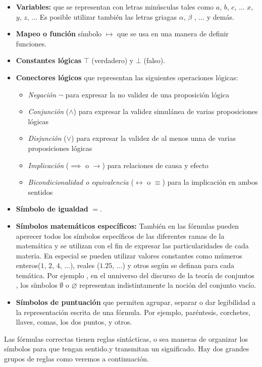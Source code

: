 \begin{itemize}
\item{\textbf{Variables:} que se representan con letras minúsculas tales como $a$, $b$, $c$, ... $x$, $y$, $z$, ... Es posible  utilizar también las letras griagas $\alpha$, $\beta$ , ... y demás.}
\item{\textbf{Mapeo o función} símbolo $\mapsto$ que se usa en una manera de definir funciones.}
\item{\textbf{Constantes lógicas} $\top$ (verdadero) y $\bot$ (falso).}
\item{\textbf{Conectores lógicos} que representan las siguientes operaciones lógicas:}
	\begin{itemize}
		\item{\textit{Negación} $\neg$ para expresar la no validez de una proposición lógica}
		\item{\textit{Conjunción} ($\land$) para expresar la validez simulánea de varias proposiciones lógicas}
		\item{\textit{Disjunción} ($\lor$) para expresar la validez de al menos unna de varias proposiciones lógicas}
		\item{\textit{Implicación} ($\implies$ o $\to$) para relaciones de causa y efecto}
		\item{\textit{Bicondicionalidad o equivalencia} ($\leftrightarrow$ o $\equiv$) para la implicación en ambos sentidos}
	\end{itemize}
\item{\textbf{Símbolo de igualdad} $=$.}
\item{\textbf{Símbolos matemáticos específicos:} También en las fórmulas pueden aperecer todos los símbolos específicos de las diferentes ramas de la matemática y se utilizan con el fin de expresar las particularidades de cada materia. En especial se pueden utilizar valores constantes como múmeros enteros($1$, $2$, $4$, ...), reales ($1.25$, ...) y otros según se definan para cada temática. Por ejemplo , en el unniverso del discurso de la teoría de conjuntos , los símbolos $\emptyset$ o $\varnothing$ representan indistintamente la noción del conjunto vacío.}
\item{\textbf{Símbolos de puntuación} que permiten agrupar, separar o dar legibilidad a la representación escrita de una fórmula. Por ejemplo, paréntesis, corchetes, llaves, comas, los dos puntos, y otros.}
\end{itemize}

Las fórmulas correctas tienen reglas sintácticas, o sea maneras de organizar los símbolos para que tengan sentido.y transmitan un significado. Hay dos grandes grupos de reglas como veremos a continuación. 

